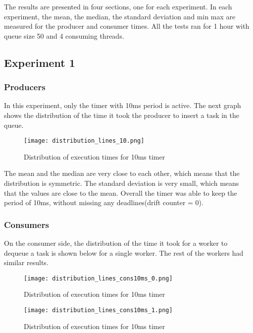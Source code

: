 \documentclass[12pt, a4paper]{report}
\begin{document}
The results are presented in four sections, one for each experiment. In each experiment, the mean, the median,
the standard deviation and min max are measured for the producer and consumer times. All the tests ran for 1
hour with queue size 50 and 4 consuming threads.

\subsection*{Experiment 1}

\subsubsection*{Producers}

In this experiment, only the timer with 10ms period is active. The next graph shows the
distribution of the time it took the producer to insert a task in the queue. 

\begin{figure}[H]
    \centering
    \texttt{[image: distribution\_lines\_10.png]}
    \caption{Distribution of execution times for 10ms timer}
\end{figure}

The mean and the median are very close to each other, which means that the distribution is
symmetric. The standard deviation is very small, which means that the values are close to 
the mean. Overall the timer was able to keep the period of 10ms, without missing any deadlines(drift counter = 0).

\subsubsection*{Consumers}

On the consumer side, the distribution of the time it took for a worker to dequeue a task is shown
below for a single worker. The rest of the workers had similar results.

\begin{figure}[H]
    \centering
    \texttt{[image: distribution\_lines\_cons10ms\_0.png]}
    \caption{Distribution of execution times for 10ms timer}
\end{figure}

\begin{figure}[H]
    \centering
    \texttt{[image: distribution\_lines\_cons10ms\_1.png]}
    \caption{Distribution of execution times for 10ms timer}
\end{figure}
\end{document}
